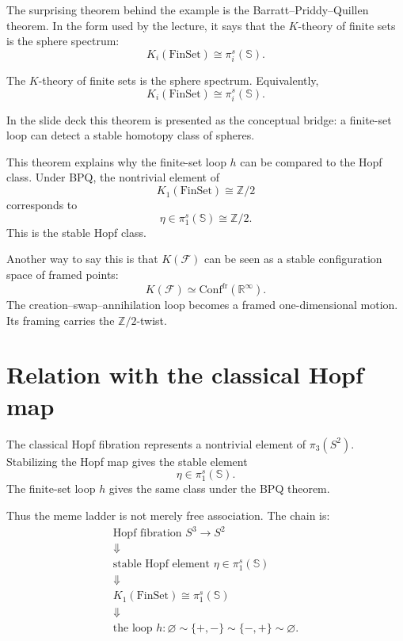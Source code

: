 The surprising theorem behind the example is the Barratt--Priddy--Quillen theorem.  In the form used by the lecture, it says that the \(K\)-theory of finite sets is the sphere spectrum:
\[
  K_i(\mathrm{FinSet})
  \cong
  \pi_i^s(\mathbb S).
\]

\begin{theorem}
The \(K\)-theory of finite sets is the sphere spectrum.  Equivalently,
\[
  K_i(\mathrm{FinSet})\cong \pi_i^s(\mathbb S).
\]
\end{theorem}

In the slide deck this theorem is presented as the conceptual bridge: a finite-set loop can detect a stable homotopy class of spheres.


This theorem explains why the finite-set loop \(h\) can be compared to the Hopf class.  Under BPQ, the nontrivial element of
\[
  K_1(\mathrm{FinSet})\cong\mathbb Z/2
\]
corresponds to
\[
  \eta\in \pi_1^s(\mathbb S)\cong\mathbb Z/2.
\]
This is the stable Hopf class.

Another way to say this is that \(K(\mathcal F)\) can be seen as a stable configuration space of framed points:
\[
  K(\mathcal F)\simeq \mathrm{Conf}^{\mathrm{fr}}(\mathbb R^\infty).
\]
The creation--swap--annihilation loop becomes a framed one-dimensional motion.  Its framing carries the \(\mathbb Z/2\)-twist.

\section{Relation with the classical Hopf map}

The classical Hopf fibration represents a nontrivial element of \(\pi_3(S^2)\).  Stabilizing the Hopf map gives the stable element
\[
  \eta\in \pi_1^s(\mathbb S).
\]
The finite-set loop \(h\) gives the same class under the BPQ theorem.

Thus the meme ladder is not merely free association.  The chain is:
\[
\begin{array}{c}
\text{Hopf fibration }S^3\to S^2\\
\Downarrow\\
\text{stable Hopf element }\eta\in\pi_1^s(\mathbb S)\\
\Downarrow\\
K_1(\mathrm{FinSet})\cong\pi_1^s(\mathbb S)\\
\Downarrow\\
\text{the loop }h:\varnothing\sim\{+,-\}\sim\{-,+\}\sim\varnothing.
\end{array}
\]

